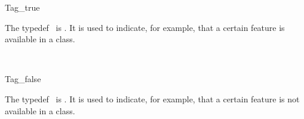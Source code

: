 \begin{ccRefClass}{Tag_true}

\ccDefinition

The typedef \ccRefName\ is .
It is used to indicate, for example,
that a certain feature is available in a class.



\ccSeeAlso
{} \\

\end{ccRefClass}


\begin{ccRefClass}{Tag_false}

\ccDefinition

The typedef \ccRefName\ is .
It is used to indicate, for example,
that a certain feature is not available in a class.



\ccSeeAlso
{} \\

\end{ccRefClass}




\ccParDims



